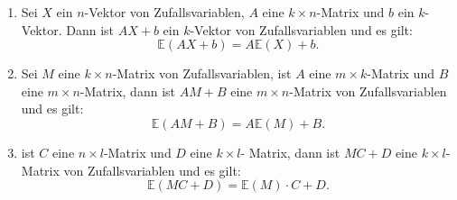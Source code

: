 \documentclass[10pt]{article}
\newcommand{\EW}{\mathbb{E}} %
\begin{document}
			\begin{Proposition}
				\begin{enumerate}
					\item Sei $X$ ein $n$-Vektor von Zufallsvariablen, $A$ eine $k \times n$-Matrix und $b$ ein $k$-Vektor. Dann ist $AX+b$ ein $k$-Vektor von Zufallsvariablen und es gilt:
					\begin{equation*}
						\EW(AX+b) = A \EW(X)+b.
					\end{equation*}
					\item Sei $M$ eine $k\times n$-Matrix von Zufallsvariablen, ist $A$ eine $m \times k$-Matrix und $B$ eine $m \times n$-Matrix, dann ist $AM+B$ eine $m \times n$-Matrix von Zufallsvariablen und es gilt:
					\begin{equation*}
						\EW(AM+B) = A\EW(M)+B.
					\end{equation*}
					\item  ist $C$ eine $n \times l$-Matrix und $D$ eine $k\times l$- Matrix, dann ist $MC+D$ eine $k \times l$-Matrix von Zufallsvariablen und es gilt:
					\begin{equation*}
						\EW(MC+D) = \EW(M) \cdot C + D.
					\end{equation*}
				\end{enumerate}
			\end{Proposition}
			
\end{document}
